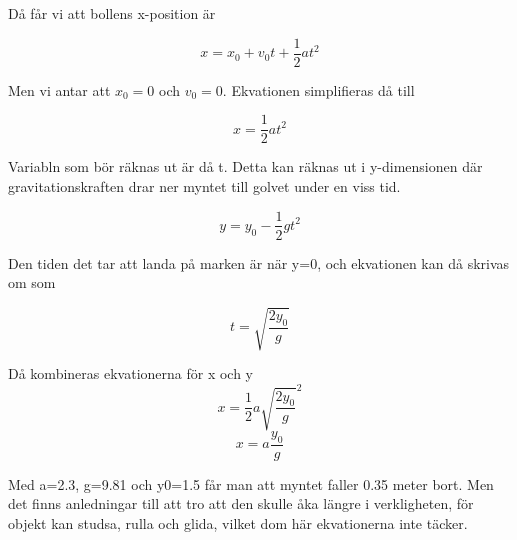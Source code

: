 \documentclass[a4paper,12pt]{article}
\begin{document}
\begin{enumerate}
            Då får vi att bollens x-position är

            $$x=x_0+v_0t+\frac{1}{2}at^2$$

            Men vi antar att $x_0=0$ och $v_0=0$.
            Ekvationen simplifieras då till

            $$x=\frac{1}{2}at^2$$

            Variabln som bör räknas ut är då t. Detta
            kan räknas ut i y-dimensionen där gravitationskraften
            drar ner myntet till golvet under en viss tid.

            $$y=y_0-\frac{1}{2}gt^2$$

            Den tiden det tar att landa på marken är när y=0,
            och ekvationen kan då skrivas om som

            $$t=\sqrt{\frac{2y_0}{g}}$$

            Då kombineras ekvationerna för x och y
            $$x=\frac{1}{2}a\sqrt{\frac{2y_0}{g}}^2$$
            $$x=a\frac{y_0}{g}$$

            Med a=2.3, g=9.81 och y0=1.5 får man att
            myntet faller 0.35 meter bort. Men det finns anledningar
            till att tro att den skulle åka längre i verkligheten, för
            objekt kan studsa, rulla och glida, vilket dom här
            ekvationerna inte täcker.

\end{enumerate}
\end{document}
